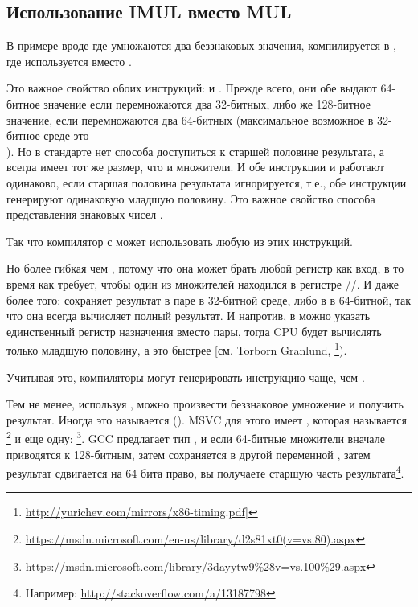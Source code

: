 \subsection{Использование IMUL вместо MUL}
\label{IMUL_over_MUL}

В примере вроде  где умножаются два беззнаковых значения, компилируется в
, где используется \IMUL вместо \MUL.

Это важное свойство обоих инструкций: \MUL и \IMUL{}.
Прежде всего, они обе выдают 64-битное значение если перемножаются два 32-битных, либо же 128-битное значение,
если перемножаются два 64-битных (максимальное возможное  в 32-битное среде это \\
).
Но в стандарте \CCpp нет способа доступиться к старшей половине результата, а  всегда имеет
тот же размер, что и множители. %
И обе инструкции \MUL и \IMUL работают одинаково, если старшая половина результата игнорируется, т.е., обе инструкции
генерируют одинаковую младшую половину.
Это важное свойство способа представления знаковых чисел .

Так что компилятор с \CCpp может использовать любую из этих инструкций.

Но \IMUL более гибкая чем \MUL, потому что она может брать любой регистр как вход, в то время как \MUL требует,
чтобы один из множителей находился в регистре \AX/\EAX/\RAX.
И даже более того: \MUL сохраняет результат в паре  в 32-битной среде, либо в  в 64-битной,
так что она всегда вычисляет полный результат.
И напротив, в \IMUL можно указать единственный регистр назначения вместо пары, тогда \ac{CPU} будет вычислять только
младшую половину, а это быстрее
[см. Torborn Granlund, \footnote{\url{http://yurichev.com/mirrors/x86-timing.pdf}]}).

Учитывая это, компиляторы \CCpp могут генерировать инструкцию \IMUL чаще, чем \MUL.

Тем не менее, используя , можно произвести беззнаковое умножение и получить  результат.
Иногда это называется  ().
MSVC для этого имеет , которая называется \footnote{\url{https://msdn.microsoft.com/en-us/library/d2s81xt0(v=vs.80).aspx}} и еще одну: \footnote{\url{https://msdn.microsoft.com/library/3dayytw9%28v=vs.100%29.aspx}}.
GCC предлагает тип , и если 64-битные множители вначале приводятся к 128-битным,
затем  сохраняется в другой переменной , затем результат сдвигается на 64 бита
право, вы получаете старшую часть результата\footnote{Например: \url{http://stackoverflow.com/a/13187798}}.

